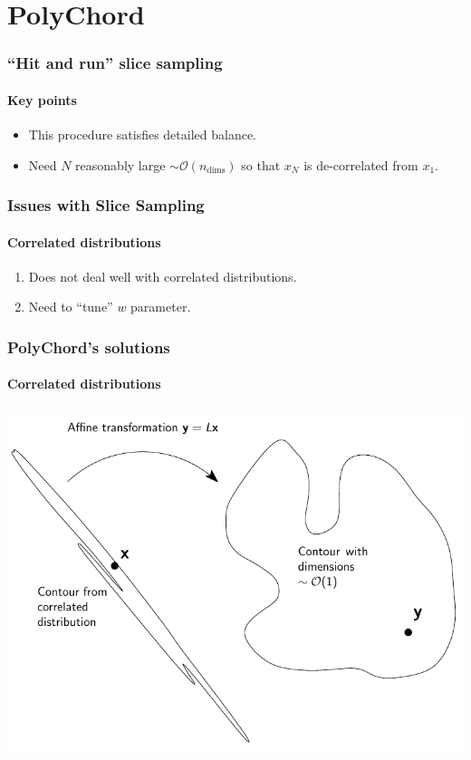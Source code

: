 \documentclass[]{beamer}
\begin{document}
\section{PolyChord}


\begin{frame}
  \frametitle{``Hit and run'' slice sampling}
  \framesubtitle{Key points}

  \begin{itemize}
    \pause\item This procedure satisfies detailed balance.
    \pause\item Need $N$ reasonably large $\sim\mathcal{O}(n_\mathrm{dims})$ so that $x_N$ is de-correlated from $x_1$.
  \end{itemize}
\end{frame}

\begin{frame}
  \frametitle{Issues with Slice Sampling}
  \framesubtitle{Correlated distributions}

  \begin{enumerate}
    \pause\item Does not deal well with correlated distributions.
    \pause\item Need to ``tune'' $w$ parameter.
  \end{enumerate}
\end{frame}

\begin{frame}
  \frametitle{PolyChord's solutions}
  \framesubtitle{Correlated distributions}

  \includegraphics[width=\textwidth]{figures/contour_transform}

\end{frame}
\end{document}
